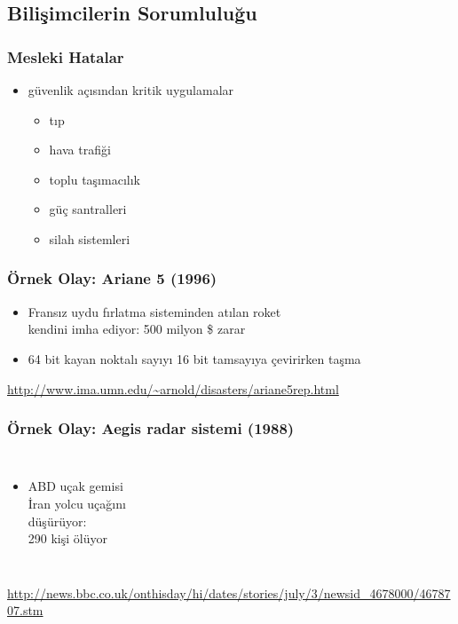 \documentclass[dvipsnames]{beamer}
\theoremstyle{definition}
\theoremstyle{example}
\theoremstyle{plain}
\begin{document}
\subsection{Bilişimcilerin Sorumluluğu}

\begin{frame}
  \frametitle{Mesleki Hatalar}

  \begin{itemize}
    \item güvenlik açısından kritik uygulamalar
    \begin{itemize}
      \item tıp
      \item hava trafiği
      \item toplu taşımacılık
      \item güç santralleri
      \item silah sistemleri
    \end{itemize}
  \end{itemize}
\end{frame}

\begin{frame}
  \frametitle{Örnek Olay: Ariane 5 (1996)}

  \begin{center}
  \end{center}

  \begin{itemize}
    \item Fransız uydu fırlatma sisteminden atılan roket\\
      kendini imha ediyor: 500 milyon \$ zarar

    \item 64 bit kayan noktalı sayıyı 16 bit tamsayıya çevirirken taşma
  \end{itemize}

  \medskip
  \tiny{\url{http://www.ima.umn.edu/~arnold/disasters/ariane5rep.html}}
\end{frame}

\begin{frame}
  \frametitle{Örnek Olay: Aegis radar sistemi (1988)}

  \begin{columns}

    \begin{itemize}
      \item ABD uçak gemisi\\
        İran yolcu uçağını\\
        düşürüyor:\\
        290 kişi ölüyor
    \end{itemize}
  \end{columns}

  \medskip
  \tiny{\url{http://news.bbc.co.uk/onthisday/hi/dates/stories/july/3/newsid_4678000/4678707.stm}}
\end{frame}
\end{document}
